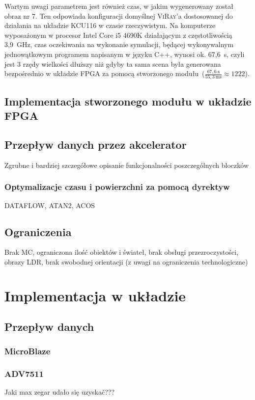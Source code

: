 Wartym uwagi parametrem jest również czas, w jakim wygenerowany został obraz nr 7. Ten odpowiada konfiguracji domyślnej \textsc{ViRay}'a dostosowanej do działania na układzie KCU116 w czasie rzeczywistym. Na komputerze wyposażonym w procesor Intel Core i5 4690K działającym z częstotliwością 3,9~GHz, czas oczekiwania na wykonanie symulacji, będącej wykonywalnym jednowątkowym programem napisanym w języku C++, wynosi ok. 67,6~s, czyli jest 3 rzędy wielkości dłuższy niż gdyby ta sama scena była generowana bezpośrednio w układzie FPGA za pomocą stworzonego modułu~($\frac{67,6~\mathrm{s}}{55,3~\mathrm{ms}}\approx 1222$). 



\subsection{Implementacja stworzonego modułu w układzie FPGA}



\subsection{Przepływ danych przez akcelerator}
Zgrubne i bardziej szczegółowe opisanie funkcjonalności poszczególnych bloczków
\subsubsection{Optymalizacje czasu i powierzchni za pomocą dyrektyw}
DATAFLOW, ATAN2, ACOS

\subsection{Ograniczenia}
Brak MC, ograniczona ilość obiektów i świateł, brak obsługi przezroczystości, obrazy LDR, brak swobodnej orientacji (z uwagi na ograniczenia technologiczne)

\section{Implementacja w układzie}
\subsection{Przepływ danych}
\subsubsection{MicroBlaze}
\subsubsection{ADV7511}
Jaki max zegar udało się uzyskać???

